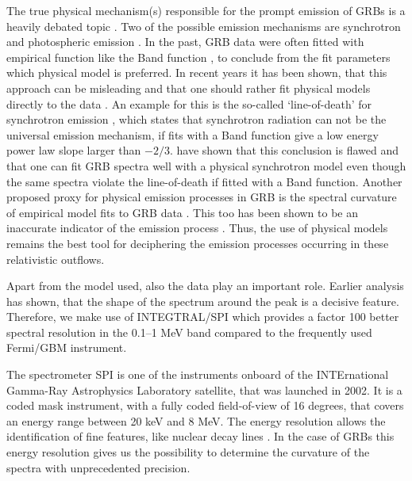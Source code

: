 \documentclass[twocolumn,traditabstract]{aa}
\begin{document}
The true physical mechanism(s) responsible for the prompt emission of GRBs is a heavily debated topic \citep[for a review see][]{KumarZhang2015}. %
Two of the possible emission mechanisms are synchrotron \citep[e.g.][]{syn_shell, bosnjak_syn, synch} and photospheric emission \citep[e.g.][]{Goodman1986, photo_1, photo_2, photo_3}. In the past, GRB data were often fitted with empirical function like the Band function \citep{band}, to conclude from the fit parameters which physical model is preferred. In recent years it has been shown, that this approach can be misleading and that one should rather fit physical models directly to the data \citep{Burgess-2014, physical_models, synch}. An example for this is the so-called `line-of-death' for synchrotron emission \citep{line-of-death, line-of-death2}, which states that synchrotron radiation can not be the universal emission mechanism, if fits with a Band function give a low energy power law slope larger than $-2/3$. \citet{synch} have shown that this conclusion is flawed and that one can fit GRB spectra well with a physical synchrotron model even though the same spectra violate the line-of-death if fitted with a Band function. Another proposed proxy for physical emission processes in GRB  is the spectral curvature of empirical model fits to GRB data \citep{Yu-2015, Axelsson-2015}. This too has been shown to be an inaccurate indicator of the emission process \citep{Burgess2019}. Thus, the use of physical models remains the best tool for deciphering the emission processes occurring in these relativistic outflows.

Apart from the model used, also the data play an important role. Earlier analysis has shown, that the shape of the spectrum around the peak is a decisive feature. Therefore, we make use of INTEGTRAL/SPI which provides a factor 100 better spectral resolution in the 0.1--1 MeV band compared to the frequently used Fermi/GBM instrument.

The spectrometer SPI is one of the instruments onboard of the INTErnational Gamma-Ray Astrophysics Laboratory \citep[INTEGRAL;][]{integral} satellite, that was launched in 2002. It is a coded mask instrument, with a fully coded field-of-view of 16 degrees, that covers an energy range between 20 keV and 8 MeV. The energy resolution allows the identification of fine features, like nuclear decay lines \citep{spi_main}. In the case of GRBs this energy resolution gives us the possibility to determine the curvature of the spectra with unprecedented precision.
\end{document}
